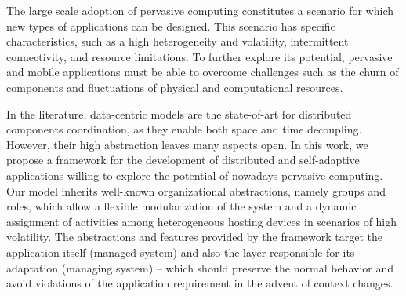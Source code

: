 The large scale adoption of pervasive computing constitutes a scenario for which new types of applications can be designed. This scenario has specific characteristics, such as a high heterogeneity and volatility, intermittent connectivity, and resource limitations. To further explore its potential, pervasive and mobile applications must be able to overcome challenges such as the churn of components and fluctuations of physical and computational resources. 



In the literature, data-centric models are the state-of-art for distributed components coordination, as they enable both space and time decoupling. However, their high abstraction leaves many aspects open. In this work, we propose a framework for the development of distributed and self-adaptive applications willing to explore the potential of nowadays pervasive computing. Our model inherits well-known organizational abstractions, namely groups and roles, which allow a flexible modularization of the system and a dynamic assignment of activities among heterogeneous hosting devices in scenarios of high volatility. The abstractions and features provided by the framework target the application itself (managed system) and also the layer responsible for its adaptation (managing system) -- which should preserve the normal behavior and avoid violations of the application requirement in the advent of context changes.


